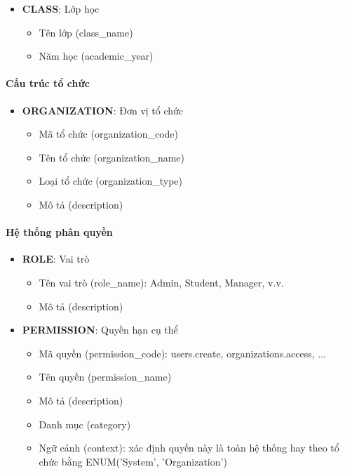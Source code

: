\begin{itemize}[leftmargin=*]
    \item \textbf{CLASS}: Lớp học
    \begin{itemize}
        \item Tên lớp (class\_name)
        \item Năm học (academic\_year)
    \end{itemize}
\end{itemize}

\paragraph{Cấu trúc tổ chức}
\begin{itemize}[leftmargin=*]
    \item \textbf{ORGANIZATION}: Đơn vị tổ chức
    \begin{itemize}
        \item Mã tổ chức (organization\_code)
        \item Tên tổ chức (organization\_name)
        \item Loại tổ chức (organization\_type)
        \item Mô tả (description)
    \end{itemize}
\end{itemize}

\paragraph{Hệ thống phân quyền}

\begin{itemize}[leftmargin=*]
    \item \textbf{ROLE}: Vai trò
    \begin{itemize}
        \item Tên vai trò (role\_name): Admin, Student, Manager, v.v.
        \item Mô tả (description)
    \end{itemize}
    
    \item \textbf{PERMISSION}: Quyền hạn cụ thể
    \begin{itemize}
        \item Mã quyền (permission\_code): users.create, organizations.access, ...
        \item Tên quyền (permission\_name)
        \item Mô tả (description)
        \item Danh mục (category)
        \item Ngữ cảnh (context): xác định quyền này là toàn hệ thống hay theo tổ chức bằng ENUM('System', 'Organization')
    \end{itemize}
\end{itemize}

